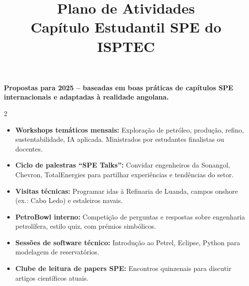 \documentclass[11pt]{article}
\title{\vspace{-1cm}\Huge\bfseries\color{spedark} Plano de Atividades \\[0.2cm] \Large Capítulo Estudantil SPE do ISPTEC}
\author{}
\date{}
\begin{document}
\maketitle

\vspace{-0.8cm}

\begin{center}
  \small\textcolor{spedark}{\textbf{Propostas para 2025 -- baseadas em boas práticas de capítulos SPE internacionais e adaptadas à realidade angolana.}}
\end{center}

\vspace{0.3cm}

\begin{multicols}{2}


\begin{tcolorbox}[title={\large\color{spedark}📚 Educacionais e Técnicos}]
  \begin{itemize}
    \item \textbf{Workshops temáticos mensais:} Exploração de petróleo, produção, refino, sustentabilidade, IA aplicada. Ministrados por estudantes finalistas ou docentes.
    \item \textbf{Ciclo de palestras “SPE Talks”:} Convidar engenheiros da Sonangol, Chevron, TotalEnergies para partilhar experiências e tendências do setor.
    \item \textbf{Visitas técnicas:} Programar idas à Refinaria de Luanda, campos onshore (ex.: Cabo Ledo) e estaleiros navais.
    \item \textbf{PetroBowl interno:} Competição de perguntas e respostas sobre engenharia petrolífera, estilo quiz, com prémios simbólicos.
    \item \textbf{Sessões de software técnico:} Introdução ao Petrel, Eclipse, Python para modelagem de reservatórios.
    \item \textbf{Clube de leitura de papers SPE:} Encontros quinzenais para discutir artigos científicos atuais.
  \end{itemize}
\end{tcolorbox}


\end{multicols}
\end{document}
